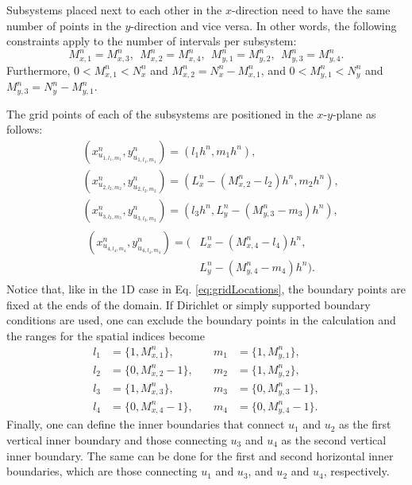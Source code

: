\documentclass[fleqn]{jaes}
\begin{document}
Subsystems placed next to each other in the $x$-direction need to have the same number of points in the $y$-direction and vice versa. In other words, the following constraints apply to the number of intervals per subsystem:
\begin{equation*}
    M_{x, 1}^n = M_{x, 3}^n,\ \ M_{x, 2}^n = M_{x, 4}^n,\ \ M_{y, 1}^n = M_{y, 2}^n,\ \ M_{y, 3}^n = M_{y, 4}^n.
\end{equation*}
Furthermore, $0<M_{x,1}^n<N_x^n$ and $M_{x,2}^n = N_x^n-M_{x,1}^n$, and $0<M_{y,1}^n<N_y^n$ and $M_{y,3}^n = N_y^n-M_{y,1}^n$.

The grid points of each of the subsystems are positioned in the $x$-$y$-plane as follows:  
\begin{subequations}
    \begin{align}
        &\!\!\!\left(x_{u_{1, l_1, m_1}}^n, y_{u_{1, l_1, m_1}}^n\right) = \left(l_1h^n, m_1h^n\right),\\
        &\!\!\!\left(x_{u_{2, l_2, m_2}}^n, y_{u_{2, l_2, m_2}}^n\right) =  \left(L_x^n-(M_{x,2}^n-l_2)h^n, m_2h^n\right),\\
        &\!\!\!\left(x_{u_{3, l_3, m_3}}^n, y_{u_{3, l_3, m_3}}^n\right) = \left(l_3h^n, L_y^n-(M_{y,3}^n-m_3)h^n\right),\\
        &\!\!\!\begin{aligned}\left(x_{u_{4, l_4, m_4}}^n, y_{u_{4, l_4, m_4}}^n\right) =
        \Big(&L_x^n-(M_{x,4}^n-l_4)h^n,\\ \qquad &L_y^n-(M_{y,4}^n-m_4)h^n\Big).\end{aligned}
    \end{align}
\end{subequations}
Notice that, like in the 1D case in Eq. \eqref{eq:gridLocations}, the boundary points are fixed at the ends of the domain. If Dirichlet or simply supported boundary conditions are used, one can exclude the boundary points in the calculation and the ranges for the spatial indices become 
\begin{equation}\label{eq:rangesLM}
    \begin{aligned}
        l_1 &= \{1, M_{x,1}^n\}, &\quad m_1 &= \{1, M_{y,1}^n\}, \\
         l_2 &= \{0, M_{x,2}^n-1\}, &\quad m_2 &= \{1, M_{y,2}^n\},\\
        l_3 &= \{1, M_{x,3}^n\},&\quad m_3 &= \{0, M_{y,3}^n-1\},\\
        l_4 &= \{0, M_{x,4}^n-1\}, &\quad m_4 &= \{0, M_{y,4}^n-1\}.
    \end{aligned}
\end{equation}
Finally, one can define the inner boundaries that connect $u_1$ and $u_2$ as the first vertical inner boundary and those connecting $u_3$ and $u_4$ as the second vertical inner boundary. The same can be done for the first and second horizontal inner boundaries, which are those connecting $u_1$ and $u_3$, and $u_2$ and $u_4$, respectively. 
\end{document}
